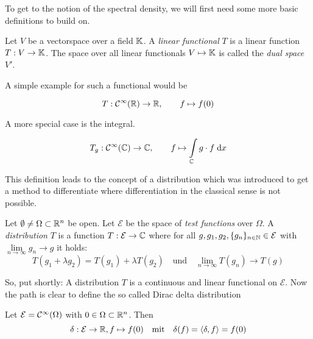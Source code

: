 To get to the notion of the spectral density, we will first need some more basic definitions to build on.

\begin{definition}
    Let $V$ be a vectorspace over a field $\mathbb{K}$. A \emph{linear functional} $T$ is a linear function $T: V \to \mathbb{K}$.
    The space over all linear functionals $V \mapsto \mathbb{K}$ is called the \emph{dual space} $V'$.
\end{definition}

A simple example for such a functional would be

\begin{equation} \label{eq:functional_example_simple}
    T: \mathcal{C}^{\infty}(\mathbb{R}) \to \mathbb{R}, \qquad f \mapsto f(0)
\end{equation}

A more special case is the integral.

\begin{equation} \label{eq:functional_example_integral}
    T_g: \mathcal{C}^{\infty}(\mathbb{C}) \to \mathbb{C}, \qquad f \mapsto \int\limits_{\mathbb{C}} g \cdot f \;\mathrm{d}x
\end{equation}

This definition leads to the concept of a distribution which was introduced to get a method to differentiate where differentiation in the classical sense is not possible.

\begin{definition}[distribution]
    Let $\emptyset \neq \Omega \subset \mathbb{R}^n$ be open.
    Let $\mathcal{E}$ be the space of \emph{test functions} over $\Omega$.
    A \emph{distribution} $T$ is a function $T: \mathcal{E} \to \mathbb{C}$ where for all
    $g, g_1, g_2, \{g_n\}_{n \in \mathbb{N}} \in \mathcal{E}$
    with $\lim\limits_{n \to \infty} g_n \to g$ it holds:
    $$T(g_1 + \lambda g_2) = T(g_1) + \lambda T(g_2) \quad \text{und}\quad \lim\limits_{n \to \infty} T(g_n) \to T(g)$$
\end{definition}

So, put shortly: A distribution $T$ is a continuous and linear functional on $\mathcal{E}$.
Now the path is clear to define the so called Dirac delta distribution

\begin{definition}
    Let $\mathcal{E} = \mathcal{C}^{\infty}(\Omega)$ with $0 \in \Omega \subset \mathbb{R}^n$.
    Then
    $$\delta: \mathcal{E} \to \mathbb{R}, f \mapsto f(0) \quad \text{mit} \quad \delta(f) = \langle \delta, f \rangle = f(0)$$
\end{definition}

